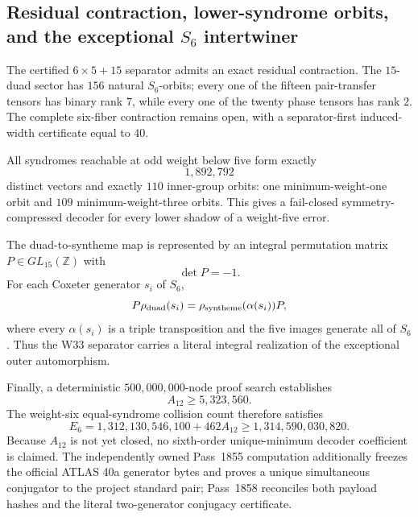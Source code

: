 \subsection{Residual contraction, lower-syndrome orbits, and the exceptional $S_6$ intertwiner}
The certified $6\times5+15$ separator admits an exact residual contraction.  The
$15$-duad sector has $156$ natural $S_6$-orbits; every one of the fifteen
pair-transfer tensors has binary rank $7$, while every one of the twenty phase
tensors has rank $2$.  The complete six-fiber contraction remains open, with a
separator-first induced-width certificate equal to $40$.

All syndromes reachable at odd weight below five form exactly
\[
  1{,}892{,}792
\]
distinct vectors and exactly $110$ inner-group orbits: one minimum-weight-one
orbit and $109$ minimum-weight-three orbits.  This gives a fail-closed
symmetry-compressed decoder for every lower shadow of a weight-five error.

The duad-to-syntheme map is represented by an integral permutation matrix
$P\in GL_{15}(\mathbb Z)$ with
\[
  \det P=-1.
\]
For each Coxeter generator $s_i$ of $S_6$,
\[
  P\rho_{\rm duad}(s_i)=\rho_{\rm syntheme}(\alpha(s_i))P,
\]
where every $\alpha(s_i)$ is a triple transposition and the five images generate
all of $S_6$.  Thus the W33 separator carries a literal integral realization of
the exceptional outer automorphism.

Finally, a deterministic $500{,}000{,}000$-node proof search establishes
\[
 A_{12}\ge 5{,}323{,}560.
\]
The weight-six equal-syndrome collision count therefore satisfies
\[
 E_6=1{,}312{,}130{,}546{,}100+462A_{12}
 \ge 1{,}314{,}590{,}030{,}820.
\]
Because $A_{12}$ is not yet closed, no sixth-order unique-minimum decoder
coefficient is claimed.  The independently owned Pass~1855 computation additionally freezes the official
ATLAS 40a generator bytes and proves a unique simultaneous conjugator to the
project standard pair; Pass~1858 reconciles both payload hashes and the literal
two-generator conjugacy certificate.
